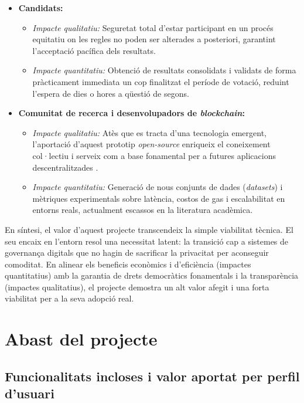 \documentclass[12pt,a4paper,catalan]{article}
\begin{document}
\begin{itemize}
    \item \textbf{Candidats:}
    \begin{itemize}
        \item \textit{Impacte qualitatiu:} Seguretat total d'estar participant en un procés equitatiu on les regles no poden ser alterades a posteriori, garantint l'acceptació pacífica dels resultats.
        \item \textit{Impacte quantitatiu:} Obtenció de resultats consolidats i validats de forma pràcticament immediata un cop finalitzat el període de votació, reduint l'espera de dies o hores a qüestió de segons.
    \end{itemize}

    \item \textbf{Comunitat de recerca i desenvolupadors de \textit{blockchain}:}
    \begin{itemize}
        \item \textit{Impacte qualitatiu:} Atès que es tracta d'una tecnologia emergent, l'aportació d'aquest prototip \textit{open-source} enriqueix el coneixement col·lectiu i serveix com a base fonamental per a futures aplicacions descentralitzades \cite{vladucu2023}.
        \item \textit{Impacte quantitatiu:} Generació de nous conjunts de dades (\textit{datasets}) i mètriques experimentals sobre latència, costos de gas i escalabilitat en entorns reals, actualment escassos en la literatura acadèmica.
    \end{itemize}

\end{itemize}

En síntesi, el valor d'aquest projecte transcendeix la simple viabilitat tècnica. El seu encaix en l'entorn resol una necessitat latent: la transició cap a sistemes de governança digitals que no hagin de sacrificar la privacitat per aconseguir comoditat. En alinear els beneficis econòmics i d'eficiència (impactes quantitatius) amb la garantia de drets democràtics fonamentals i la transparència (impactes qualitatius), el projecte demostra un alt valor afegit i una forta viabilitat per a la seva adopció real.
\section{Abast del projecte}

\subsection{Funcionalitats incloses i valor aportat per perfil d'usuari}
\end{document}

